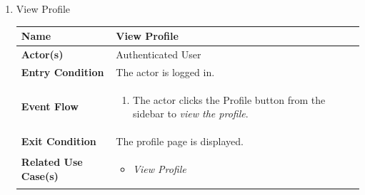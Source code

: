 \begin{enumerate}
\newpage
\item View Profile
\begin{center}
    \begin{tabular}{ | m{10em} | m{10cm}| } 
      \hline
      \textbf{Name} & View Profile  \\ 
      \hline
      \textbf{Actor(s)} & Authenticated User \\ 
      \hline
      \textbf{Entry Condition} & The actor is logged in. \\ 
      \hline
      \textbf{Event Flow} & 
          \begin{enumerate}[(1)]
              \item The actor clicks the Profile button from the sidebar to \textit{view the profile}.
          \end{enumerate}
      \\ 
      \hline
      \textbf{Exit Condition} & The profile page is displayed.  \\ 
      \hline
      \textbf{Related Use Case(s)} & 
      \begin{itemize}
          \item \textit{View Profile}
      \end{itemize}
          \\ 
      \hline
    \end{tabular}
     \label{tbl:uc15}
\end{center}


\newpage


\end{enumerate}
